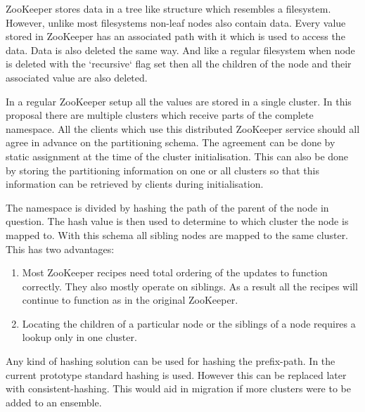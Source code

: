 \documentclass[11pt]{article}
\begin{document}
ZooKeeper stores data in a tree like structure which resembles a filesystem. However, unlike most filesystems non-leaf nodes also contain data. Every value stored in ZooKeeper has an associated path with it which is used to access the data. Data is also deleted the same way. And like a regular filesystem when node is deleted with the `recursive` flag set then all the children of the node and their associated value are also deleted.

In a regular ZooKeeper setup all the values are stored in a single cluster. In this proposal there are multiple clusters which receive parts of the complete namespace. All the clients which use this distributed ZooKeeper service should all agree in advance on the partitioning schema. The agreement can be done by static assignment at the time of the cluster initialisation. This can also be done by storing the partitioning information on one or all clusters so that this information can be retrieved by clients during initialisation.

The namespace is divided by hashing the path of the parent of the node in question. The hash value is then used to determine to which cluster the node is mapped to. With this schema all sibling nodes are mapped to the same cluster. This has two advantages:
\begin{enumerate}
  \item Most ZooKeeper recipes need total ordering of the updates to function correctly. They also mostly operate on siblings. As a result all the recipes will continue to function as in the original ZooKeeper.
  \item Locating the children of a particular node or the siblings of a node requires a lookup only in one cluster.
\end{enumerate}

Any kind of hashing solution can be used for hashing the prefix-path. In the current prototype standard hashing is used. However this can be replaced later with consistent-hashing. This would aid in migration if more clusters were to be added to an ensemble.
\end{document}

